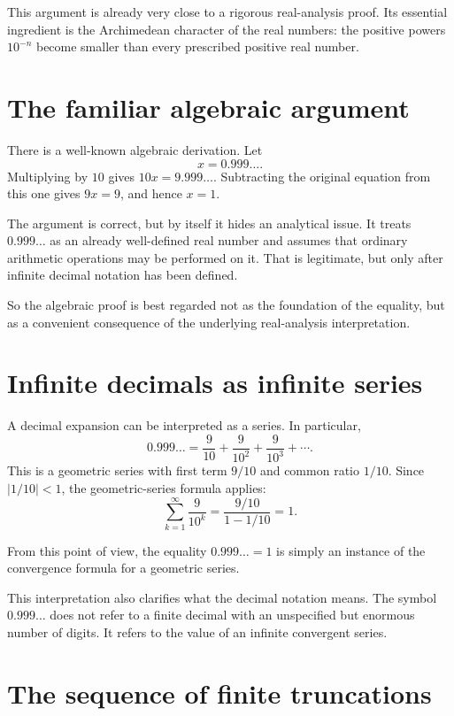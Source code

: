 \documentclass{essay}
\begin{document}
This argument is already very close to a rigorous real-analysis proof. Its essential ingredient is the Archimedean character of the real numbers: the positive powers \(10^{-n}\) become smaller than every prescribed positive real number.

\section{The familiar algebraic argument}

There is a well-known algebraic derivation. Let
\[ x=0.999\ldots. \]
Multiplying by \(10\) gives \(10x=9.999\ldots\). Subtracting the original equation from this one gives \(9x=9\), and hence \(x=1\).

The argument is correct, but by itself it hides an analytical issue. It treats \(0.999\ldots\) as an already well-defined real number and assumes that ordinary arithmetic operations may be performed on it. That is legitimate, but only after infinite decimal notation has been defined.

So the algebraic proof is best regarded not as the foundation of the equality, but as a convenient consequence of the underlying real-analysis interpretation.

\section{Infinite decimals as infinite series}

A decimal expansion can be interpreted as a series. In particular,
\[ 0.999\ldots = \frac{9}{10}+\frac{9}{10^{2}}+\frac{9}{10^{3}}+\cdots. \]
This is a geometric series with first term \(9/10\) and common ratio \(1/10\). Since \(|1/10|<1\), the geometric-series formula applies:
\[ \sum_{k=1}^{\infty}\frac{9}{10^{k}} = \frac{9/10}{1-1/10} = 1. \]

From this point of view, the equality \(0.999\ldots=1\) is simply an instance of the convergence formula for a geometric series.

This interpretation also clarifies what the decimal notation means. The symbol \(0.999\ldots\) does not refer to a finite decimal with an unspecified but enormous number of digits. It refers to the value of an infinite convergent series.

\section{The sequence of finite truncations}
\end{document}

